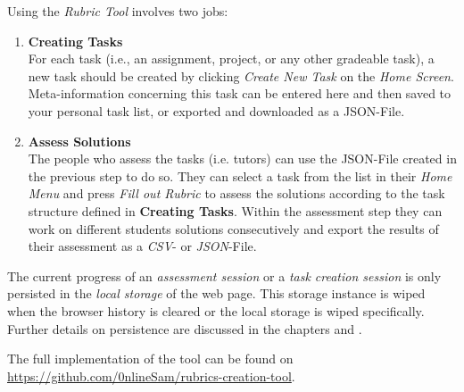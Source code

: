Using the \textit{Rubric Tool} involves two jobs:

\begin{enumerate}
  \item \textbf{Creating Tasks} \\
    For each task (i.e., an assignment, project, or any other gradeable task), a new task should be created by clicking \textit{Create New Task} on the \textit{Home Screen}. Meta-information concerning this task can be entered here and then saved to your personal task list, or exported and downloaded as a JSON-File.
  \item \textbf{Assess Solutions} \\
    The people who assess the tasks (i.e. tutors) can use the JSON-File created in the previous step to do so. They can select a task from the list in their \textit{Home Menu} and press \textit{Fill out Rubric} to assess the solutions according to the task structure defined in \textbf{Creating Tasks}. Within the assessment step they can work on different students solutions consecutively and export the results of their assessment as a \textit{CSV}- or \textit{JSON}-File.
\end{enumerate}

\begin{attention}
  The current progress of an \textit{assessment session} or a \textit{task creation session} is only persisted in the \textit{local storage} of the web page. This storage instance is wiped when the browser history is cleared or the local storage is wiped specifically. Further details on persistence are discussed in the chapters  and .
\end{attention}

The full implementation of the tool can be found on \href{https://github.com/0nlineSam/rubrics-creation-tool}{https://github.com/0nlineSam/rubrics-creation-tool}.
